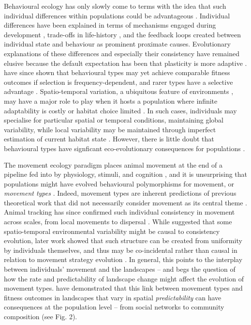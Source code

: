Behavioural ecology has only slowly come to terms with the idea that such individual differences within populations could be advantageous \citep{wilson1998}. Individual differences have been explained in terms of mechanisms engaged during development \citep{wolf2010, groothuis2011}, trade-offs in life-history \citep{wolf2007a, wolf2007}, and the feedback loops created between individual state and behaviour \citep{wolf2010} as prominent proximate causes. Evolutionary explanations of these differences and especially their consistency have remained elusive because the default expectation has been that plasticity is more adaptive \citep{wilson1998}. \citet{wolf2010} have since shown that behavioural types may yet achieve comparable fitness outcomes if selection is frequency-dependent, and rarer types have a selective advantage \citep{maynardsmith1982}. Spatio-temporal variation, a ubiquitous feature of environments \citep{levin1992}, may have a major role to play when it hosts a population where infinite adaptability is costly or habitat choice limited \citep{wolf2010}. In such cases, individuals may specialise for particular spatial or temporal conditions, maintaining global variability, while local variability may be maintained through imperfect estimation of current habitat state \citep{wolf2010, wolf2012}. However, there is little doubt that behavioural types have signficant eco-evolutionary consequences for populations \citep{sih2012, wolf2012a}.

The movement ecology paradigm places animal movement at the end of a pipeline fed into by physiology, stimuli, and cognition \citep[\emph{state},][]{wolf2010, wolf2012a}, and it is unsurprising that populations might have evolved behavioural polymorphisms for movement, or \emph{movement types} \citep[\emph{sensu}][]{wolf2010, getz2015, netz2017}. Indeed, movement types are inherent predictions of previous theoretical work that did not necessarily consider movement as its central theme \citep[e.g.][]{watson1971, lima1996}. Animal tracking has since confirmed such individual consistency in movement across scales, from local movements \citep{austin2004, leclerc2016} to dispersal \citep{duckworth2007, clobert2009, cotej.2010, duckworth2012}. While \citet{wolf2010} suggested that some spatio-temporal environmental variability might be causal to consistency evolution, later work showed that such structure can be created from uniformity by individuals themselves, and thus may be co-incidental rather than causal in relation to movement strategy evolution \citep{dejager2011, getz2015, netz2017}. In general, this points to the interplay between individuals' movement and the landscapes -- and begs the question of how the rate and predictability of landscape change \citep[\emph{sensu lato}][]{botero2015} might affect the evolution of movement types. \citet{spiegel2017} have demonstrated that this link between movement types \citep[\emph{fast} and \emph{slow}; see parallels with earlier][]{wolf2007a} and fitness outcomes in landscapes that vary in spatial \emph{predictability} can have consequences at the population level -- from social networks to community composition (see Fig. 2).

